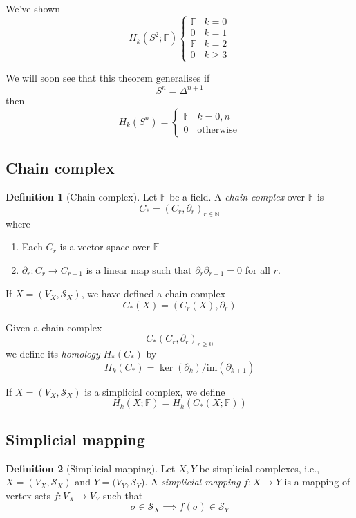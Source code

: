 \documentclass[a4paper,14pt]{extarticle}
\theoremstyle{definition}
\newtheorem*{definition}{Definition}
\begin{document}
We've shown
\[ H_k(S^2;\mathbb{F})\begin{cases} 
			      \mathbb{F} & k=0 \\
			      0 & k=1 \\
			      \mathbb{F} & k=2 \\
			      0 & k\geq3
			   \end{cases}
\]

We will soon see that this theorem generalises if \[S^n=\Delta^{n+1}\] then \[H_k(S^n)=\begin{cases}\mathbb{F}&k=0,n\\0&\text{otherwise}\end{cases}\]

\subsection{Chain complex}
\begin{definition}[Chain complex]
	Let $\mathbb{F}$ be a field. A \emph{chain complex} over $\mathbb{F}$ is \[C_*=(C_r,\partial_r)_{r\in\mathbb{N}}\] where
	\begin{enumerate}
		\item Each $C_r$ is a vector space over $\mathbb{F}$
		\item $\partial_r:C_r\rightarrow C_{r-1}$ is a linear map such that $\partial_r\partial_{r+1}=0$ for all $r$.
	\end{enumerate}
\end{definition}

If $X=(V_X,\mathcal{S}_X)$, we have defined a chain complex \[C_*(X)=(C_r(X),\partial_r)\]

Given a chain complex \[C_*(C_r,\partial_r)_{r\geq0}\] we define its \emph{homology} $H_*(C_*)$ by \[H_k(C_*)=\ker(\partial_k)/\text{im}(\partial_{k+1})\]

If $X=(V_X,\mathcal{S}_X)$ is a simplicial complex, we define \[H_k(X;\mathbb{F})=H_k(C_*(X;\mathbb{F}))\]

\subsection{Simplicial mapping}
\begin{definition}[Simplicial mapping]
	Let $X,Y$ be simplicial complexes, i.e., $X=(V_X,\mathcal{S}_X)$ and $Y=(V_Y,\mathcal{S}_Y$). A \emph{simplicial mapping} $f:X\rightarrow Y$ is a mapping of vertex sets
	$f:V_X\rightarrow V_Y$ such that \[\sigma\in\mathcal{S}_X\implies f(\sigma)\in\mathcal{S}_Y\]
\end{definition}
\end{document}
